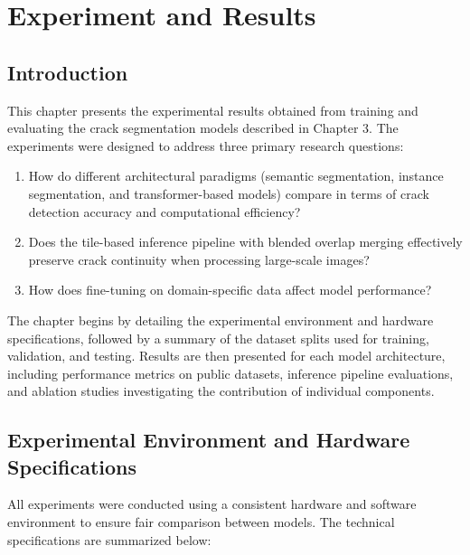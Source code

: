 \chapter{Experiment and Results}

\section{Introduction}

\hs This chapter presents the experimental results obtained from training and evaluating the crack segmentation models described in Chapter 3. The experiments were designed to address three primary research questions:
\begin{enumerate}
    \item How do different architectural paradigms (semantic segmentation, instance segmentation, and transformer-based models) compare in terms of crack detection accuracy and computational efficiency?
    \item Does the tile-based inference pipeline with blended overlap merging effectively preserve crack continuity when processing large-scale images?
    \item How does fine-tuning on domain-specific data affect model performance?
\end{enumerate}
The chapter begins by detailing the experimental environment and hardware specifications, followed by a summary of the dataset splits used for training, validation, and testing. Results are then presented for each model architecture, including performance metrics on public datasets, inference pipeline evaluations, and ablation studies investigating the contribution of individual components.

\newpage

\section{Experimental Environment and Hardware Specifications}

\hs All experiments were conducted using a consistent hardware and software environment to ensure fair comparison between models. The technical specifications are summarized below:

